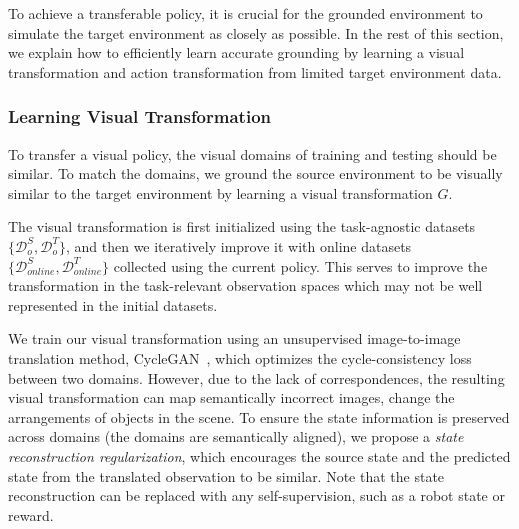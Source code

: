 To achieve a transferable policy, it is crucial for the grounded environment to simulate the target environment as closely as possible. In the rest of this section, we explain how to efficiently learn accurate grounding by learning a visual transformation and action transformation from limited target environment data.


\subsubsection{\textbf{Learning Visual Transformation}} 
\label{sec:visual_transformation}

To transfer a visual policy, the visual domains of training and testing should be similar. To match the domains, we ground the source environment to be visually similar to the target environment by learning a visual transformation $G$. 

The visual transformation is first initialized using the task-agnostic datasets $\{\mathcal{D}_o^S, \mathcal{D}_o^T\}$, and then we iteratively improve it with online datasets $\{\mathcal{D}^S_{online}, \mathcal{D}^T_{online}\}$ collected using the current policy.  This serves to improve the transformation in the task-relevant observation spaces which may not be well represented in the initial datasets.

We train our visual transformation using an unsupervised image-to-image translation method, CycleGAN~\citep{zhu2017unpaired}, which optimizes the cycle-consistency loss between two domains. However, due to the lack of correspondences, the resulting visual transformation can map semantically incorrect images, \eg change the arrangements of objects in the scene.
To ensure the state information is preserved across domains (\ie the domains are semantically aligned), we propose a \textit{state reconstruction regularization}, which encourages the source state and the predicted state from the translated observation to be similar. Note that the state reconstruction can be replaced with any self-supervision, such as a robot state or reward.


